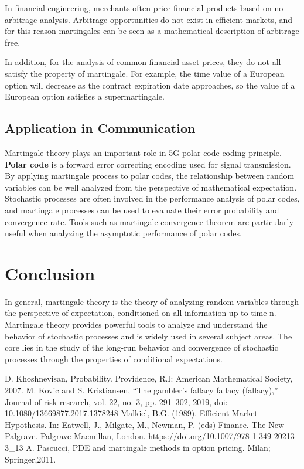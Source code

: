 \documentclass[11pt]{article} %
\begin{document}
In financial engineering, merchants often price financial products based on no-arbitrage analysis. Arbitrage opportunities do not exist in efficient markets, and for this reason martingales can be seen as a mathematical description of arbitrage free.

In addition, for the analysis of common financial asset prices, they do not all satisfy the property of martingale. For example, the time value of a European option will decrease as the contract expiration date approaches, so the value of a European option satisfies a supermartingale.
\subsection{Application in Communication}

Martingale theory plays an important role in 5G polar code coding principle\cite{lable4}. \textbf{Polar code} is a forward error correcting encoding used for signal transmission. By applying martingale process to polar codes, the relationship between random variables can be well analyzed from the perspective of mathematical expectation. Stochastic processes are often involved in the performance analysis of polar codes, and martingale processes can be used to evaluate their error probability and convergence rate. Tools such as martingale convergence theorem are particularly useful when analyzing the asymptotic performance of polar codes.

\section{Conclusion}
In general, martingale theory is the theory of analyzing random variables through the perspective of expectation, conditioned on all information up to time n. Martingale theory provides powerful tools to analyze and understand the behavior of stochastic processes and is widely used in several subject areas. The core lies in the study of the long-run behavior and convergence of stochastic processes through the properties of conditional expectations.

\begin{thebibliography}{99}
D. Khoshnevisan, Probability. Providence, R.I: American Mathematical Society, 2007.
M. Kovic and S. Kristiansen, “The gambler’s fallacy fallacy (fallacy),” Journal of risk research, vol. 22, no. 3, pp. 291–302, 2019, doi: 10.1080/13669877.2017.1378248
Malkiel, B.G. (1989). Efficient Market Hypothesis. In: Eatwell, J., Milgate, M., Newman, P. (eds) Finance. The New Palgrave. Palgrave Macmillan, London. https://doi.org/10.1007/978-1-349-20213-3\_13
A. Pascucci, PDE and martingale methods in option pricing. Milan; Springer,2011.

\end{thebibliography}
\end{document}

